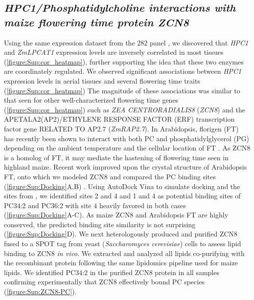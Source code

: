 \documentclass[9pt,twocolumn,twoside,lineno]{biorxiv}
\newcommand{\hpc}{\textit{HPC1}\xspace}
\begin{document}
\subsection{\textit{HPC1/Phosphatidylcholine interactions with maize flowering time protein ZCN8}}
Using the same expression dataset from the 282 panel \cite{Kremling2018-gn}, we discovered that \hpc and \textit{ZmLPCAT1} expression levels are inversely correlated in most tissues (\cref{figure:Sup:cor_heatmap}), further supporting the idea that these two enzymes are coordinately regulated.
We observed significant associations between \hpc expression levels in aerial tissues and several flowering time traits (\cref{figure:Sup:cor_heatmap})
The magnitude of these associations was similar to that seen for other well-characterized flowering time genes (\cref{figure:Sup:cor_heatmap}) such as \textit{ZEA CENTRORADIALIS8} (\textit{ZCN8})  and the APETALA2(AP2)/ETHYLENE RESPONSE FACTOR (ERF) transcription factor gene RELATED TO AP2.7 (\textit{ZmRAP2.7}).  
In Arabidopsis, florigen (FT) has recently been shown to interact with both PC and phosphatidylglycerol (PG) depending on the ambient temperature and the cellular location of FT \cite{Nakamura2014-qf, Susila2021-dz}.
As ZCN8 is a homolog of FT, it may mediate the hastening of flowering time seen in highland maize. 
Recent work improved upon the crystal structure of Arabidopsis FT, onto which we modeled ZCN8 and compared the PC binding sites (\cref{figure:Sup:Docking}A,B) \cite{Nakamura2019-ht}. 
Using AutoDock Vina to simulate docking and the sites from \cite{Nakamura2019-ht}, we identified sites 2 and 4 and 1 and 4 as potential binding sites of PC34:2 and PC36:2 with site 4 heavily favored in both cases (\cref{figure:Sup:Docking}A-C).
As maize ZCN8 and Arabidopsis FT are highly conserved, the predicted binding site similarity is not surprising (\cref{figure:Sup:Docking}D). 
We next heterologously produced and purified ZCN8 fused to a SPOT tag from yeast (\textit{Saccharomyces cerevisiae}) cells to assess lipid binding to ZCN8 \textit{in vivo}. 
We extracted and analyzed all lipids co-purifying with the recombinant protein following the same lipidomics pipeline used for maize lipids. 
We identified PC34:2 in the purified ZCN8 protein in all samples confirming experimentally that ZCN8 effectively bound PC species (\cref{figure:Sup:ZCN8-PC}).
\end{document}
